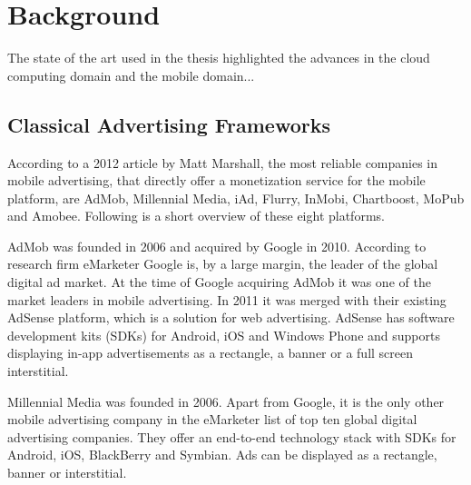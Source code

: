 
\chapter{Background} %


The state of the art used in the thesis highlighted the advances in the cloud computing domain and the mobile domain...


\ifpdf
    \graphicspath{{X/figures/PNG/}{X/figures/PDF/}{X/figures/}}
\else
    \graphicspath{{X/figures/EPS/}{X/figures/}}
\fi



\section{Classical Advertising Frameworks}

According to a 2012 article by Matt Marshall, the most reliable companies in mobile advertising, that directly offer a monetization service for the mobile platform, are AdMob, Millennial Media, iAd, Flurry, InMobi, Chartboost, MoPub and Amobee. \cite{mmarshall-top10} Following is a short overview of these eight platforms.

AdMob was founded in 2006 and acquired by Google in 2010. \cite{crunchbase-admob} According to research firm eMarketer Google is, by a large margin, the leader of the global digital ad market. \cite{emarketer-google} At the time of Google acquiring AdMob it was one of the market leaders in mobile advertising. \cite{google-admob} In 2011 it was merged with their existing AdSense platform, which is a solution for web advertising. \cite{admob-adsense} AdSense has software development kits (SDKs) for Android, iOS and Windows Phone \cite{admob-sdk}  and supports displaying in-app advertisements as a rectangle, a banner \cite{admob-banner} or a full screen interstitial.\cite{admob-interstitial}

Millennial Media was founded in 2006. \cite{crunchbase-millenial} Apart from Google, it is the only other mobile advertising company in the eMarketer list of top ten global digital advertising companies. \cite{emarketer-google} They offer an end-to-end technology stack with SDKs for Android, iOS, BlackBerry and Symbian. \cite{millenial-sdk} Ads can be displayed as a rectangle, banner or interstitial. \cite{millenial-android}

